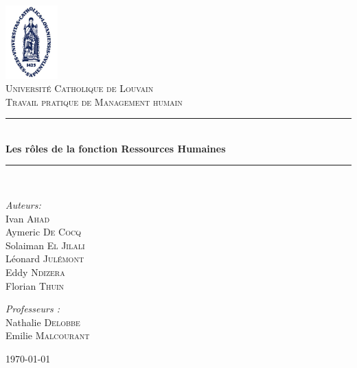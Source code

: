 \documentclass[a4paper, 12pt]{article}
\newcommand{\HRule}{\rule{\linewidth}{0.5mm}}
\begin{document}
\begin{titlepage}
\begin{center}

\includegraphics[width=0.15\textwidth]{./sedes_ucl.png}~\\[1cm]

\textsc{\LARGE Université Catholique de Louvain}\\[1.5cm]

\textsc{\Large Travail pratique de Management humain}\\[0.5cm]

\HRule \\[0.4cm]
{ \huge \bfseries Les rôles de la fonction Ressources Humaines\\[0.4cm] }

\HRule \\[1.5cm]

\noindent
\begin{minipage}[t]{0.4\textwidth}
\begin{flushleft} \large
\emph{Auteurs:}\\
Ivan \textsc{Ahad} \\
Aymeric \textsc{De Cocq} \\
Solaiman \textsc{El Jilali} \\
Léonard \textsc{Julémont} \\
Eddy \textsc{Ndizera} \\
Florian \textsc{Thuin}

\end{flushleft}
\end{minipage}%
\begin{minipage}[t]{0.4\textwidth}
\begin{flushright} \large
\emph{Professeurs :} \\
Nathalie \textsc{Delobbe} \\
Emilie \textsc{Malcourant}
\end{flushright}
\end{minipage}

\vfill

{\large \today}

\end{center}
\end{titlepage}
\end{document}
